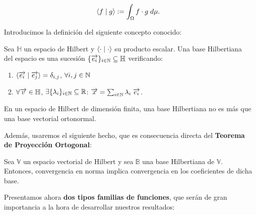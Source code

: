 \begin{equation}
    \langle f \; | \; g \rangle := \int_{\Omega} f \cdot g \; d\mu.
\end{equation}

Introducimos la definición del siguiente concepto conocido:

\begin{definicion} Sea $\mathbb{H}$ un espacio de Hilbert y $\langle \cdot \; | \; \cdot \rangle$ su producto escalar. Una base Hilbertiana del espacio es una sucesión $\{ \overrightarrow{e_i} \}_{i \in \mathbb{N}} \subseteq \mathbb{H}$ verificando:

\begin{enumerate}
    \item $\langle \overrightarrow{e_i} \; | \; \overrightarrow{e_j} \rangle = \delta_{i, j}$, $\forall i, j \in \mathbb{N}$
    \item $\forall \overrightarrow{v} \in \mathbb{H}$, $\exists \{ \lambda_i \}_{i \in \mathbb{N}} \subseteq \mathbb{R}$: $\overrightarrow{x} = \sum_{i \in \mathbb{N}} \lambda_i \; \overrightarrow{e_i}$.
\end{enumerate}

\end{definicion}

\begin{observacion}
En un espacio de Hilbert de dimensión finita, una base Hilbertiana no es más que una base vectorial ortonormal.
\end{observacion}

Además, usaremos el siguiente hecho, que es consecuencia directa del \textbf{Teorema de Proyección Ortogonal}:

\begin{proposicion} \label{prop:hilbert_convnorma_convcoef}

    Sea $\mathbb{V}$ un espacio vectorial de Hilbert y sea $\mathbb{B}$ una base Hilbertiana de $\mathbb{V}$. Entonces, convergencia en norma implica convergencia en los coeficientes de dicha base.

\end{proposicion}

Presentamos ahora \textbf{dos tipos familias de funciones}, que serán de gran importancia a la hora de desarrollar nuestros resultados:

